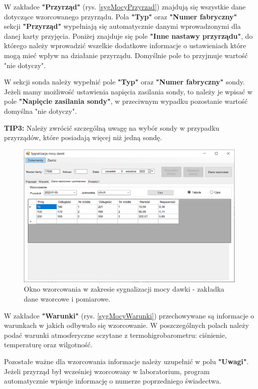 	W zakładce \textbf{"Przyrząd"} (rys. \ref{sygMocyPrzyrzad}) znajdują się wszystkie dane dotyczące wzorcowanego przyrządu. Pola \textbf{"Typ"} oraz \textbf{"Numer fabryczny"} sekcji \textbf{"Przyrząd"} wypełniają się automatycznie danymi wprowadzonymi dla danej karty przyjęcia. Poniżej znajduje się pole \textbf{"Inne nastawy przyrządu"}, do którego należy wprowadzić wszelkie dodatkowe informacje o ustawieniach które mogą mieć wpływ na działanie przyrządu. Domyślnie pole to przyjmuje wartość "nie dotyczy".
	
	W sekcji sonda należy wypełnić pole \textbf{"Typ"} oraz \textbf{"Numer fabryczny"} sondy. Jeżeli mamy możliwość ustawienia napięcia zasilania sondy, to należy je wpisać w pole \textbf{"Napięcie zasilania sondy"}, w przeciwnym wypadku pozostanie wartość domyślna "nie dotyczy".
	
	\textbf{TIP3:} Należy zwrócić szczególną uwagę na wybór sondy w przypadku przyrządów, które posiadają więcej niż jedną sondę.
	
	\begin{figure}[htb]
	\centering
	\includegraphics[width=\columnwidth]{obrazki/Wzorcowanie/syg_mocy_dawki/dane.png}
	\caption{Okno wzorcowania w zakresie sygnalizacji mocy dawki - zakładka dane wzorcowe i pomiarowe.}
	\label{sygMocyDane}
	\end{figure}
	
	W zakładce \textbf{"Warunki"} (rys. \ref{sygMocyWarunki}) przechowywane są informacje o warunkach w jakich odbywało się wzorcowanie. W poszczególnych polach należy podać warunki atmosferyczne sczytane z termohigrobarometru: ciśnienie, temperaturę oraz wilgotność.
	
	Pozostałe ważne dla wzorcowania informacje należy uzupełnić w polu \textbf{"Uwagi"}. Jeżeli przyrząd był wcześniej wzorcowany w laboratorium, program automatycznie wpisuje informację o numerze poprzedniego świadectwa. 
	
